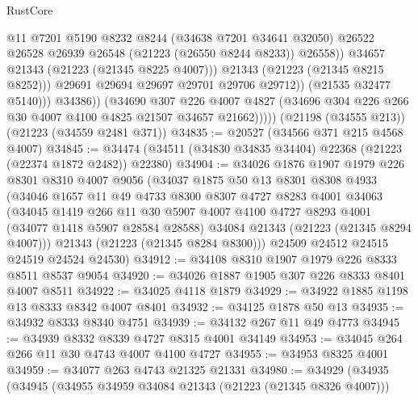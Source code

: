 \begin{lexlean}{RustCore}
\begin{coremodule}
                              @11
                              @7201
                              @5190
                              @8232
                              @8244
                              (@34638 @7201 @34641 @32050)
                              @26522
                              @26528
                              @26939
                              @26548
                              (@21223 (@26550 @8244 @8233))
                              @26558))
                          @34657
                          @21343
                          (@21223 (@21345 @8225 @4007)))
                        @21343
                        (@21223 (@21345 @8215 @8252)))
                      @29691
                      @29694
                      @29697
                      @29701
                      @29706
                      @29712))
                  (@21535 @32477 @5140)))
              @34386))
          (@34690
            @307
            @226
            @4007
            @4827
            (@34696 @304 @226 @266 @30 @4007 @4100 @4825 @21507 @34657 @21662)))))
    (@21198 (@34555 @213))
    (@21223 (@34559 @2481 @371))
@34835 := @20527 (@34566 @371 @215 @4568 @4007)
@34845 := @34474 (@34511 (@34830 @34835 @34404) @22368 (@21223 (@22374 @1872 @2482)) @22380)
@34904 := @34026
    @1876
    @1907
    @1979
    @226
    @8301
    @8310
    @4007
    @9056
    (@34037
      @1875
      @50
      @13
      @8301
      @8308
      @4933
      (@34046
        @1657
        @11
        @49
        @4733
        @8300
        @8307
        @4727
        @8283
        @4001
        @34063
        (@34045
          @1419
          @266
          @11
          @30
          @5907
          @4007
          @4100
          @4727
          @8293
          @4001
          (@34077 @1418 @5907 @28584 @28588)
          @34084
          @21343
          (@21223 (@21345 @8294 @4007)))
        @21343
        (@21223 (@21345 @8284 @8300)))
      @24509
      @24512
      @24515
      @24519
      @24524
      @24530)
@34912 := @34108 @8310 @1907 @1979 @226 @8333 @8511 @8537 @9054
@34920 := @34026 @1887 @1905 @307 @226 @8333 @8401 @4007 @8511
@34922 := @34025 @4118 @1879
@34929 := @34922 @1885 @1198 @13 @8333 @8342 @4007 @8401
@34932 := @34125 @1878 @50 @13
@34935 := @34932 @8333 @8340 @4751
@34939 := @34132 @267 @11 @49 @4773
@34945 := @34939 @8332 @8339 @4727 @8315 @4001 @34149
@34953 := @34045 @264 @266 @11 @30 @4743 @4007 @4100 @4727
@34955 := @34953 @8325 @4001
@34959 := @34077 @263 @4743 @21325 @21331
@34980 := @34929
    (@34935
      (@34945
        (@34955 @34959 @34084 @21343 (@21223 (@21345 @8326 @4007)))

\end{coremodule}
\end{lexlean}
